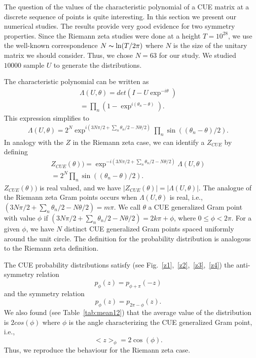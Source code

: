 \documentclass[twoside]{article}
\begin{document}
The question of the values of the characteristic polynomial of a CUE matrix 
at a discrete sequence of points is quite interesting. 
In this section we present our numerical studies. The results provide very good evidence 
for two  symmetry properties. Since the Riemann zeta studies were done at a
height $T = 10^{28}$, we use the well-known correspondence $N \thicksim \ln(T/2\pi)$ where $N$ 
is the size of the unitary matrix we should consider. Thus, we chose $N = 63$ for our
study. We studied $10000$ sample $U$ to generate the distributions.

The characteristic polynomial can be written as
\begin{align}
\Lambda(U, \theta) = det(I-U\exp^{-i\theta})\\
                   = \prod_{n}(1-\exp^{i(\theta_{n} - \theta)}).
\label{eq:cueDet}
\end{align}
This expression simplifies to
\begin{align}
\Lambda(U, \theta)  = 2^N\exp^{i(3N\pi/2 + \sum_{n}\theta_{n}/2 - N\theta/2)}\prod_{n}\sin((\theta_{n} - \theta)/2).
\label{eq:cueExpanded}
\end{align}
In analogy with the $Z$ in the Riemann zeta case, we can identify a $Z_{CUE}$ by defining
\begin{align}
Z_{CUE}(\theta))    = \exp^{-i(3N\pi/2 + \sum_{n}\theta_{n}/2 - N\theta/2)}\Lambda(U, \theta)\\
                    = 2^N\prod_{n}\sin((\theta_{n} - \theta)/2).
\label{eq:cueZ}
\end{align}
$Z_{CUE}(\theta))$ is real valued,
and we have $|Z_{CUE}(\theta)| = |\Lambda(U, \theta)|$. The analogue of the Riemann zeta 
Gram points occurs when $\Lambda(U, \theta)$ is real, i.e., 
$(3N\pi/2 + \sum_{n}\theta_{n}/2 - N\theta/2) = m\pi$.
We call $\theta$  a CUE generalized Gram point with value $\phi$  if
$(3N\pi/2 + \sum_{n}\theta_{n}/2 - N\theta/2) = 2k\pi + \phi$, where $0 \le \phi < 2\pi$.
For a given $\phi$, we have $N$ distinct CUE generalized Gram points spaced uniformly
around the unit circle.
The definition for the probability distribution is analogous to the Riemann zeta definition.

The CUE probability distributions satisfy (see Fig.~\ref{z1},~\ref{z2},~\ref{z3},~\ref{z4}) 
the anti-symmetry relation 
\begin{equation}
p_{\phi}(z) = p_{\phi+\pi}(-z)
\label{eq:antisym}
\end{equation}
and the symmetry relation 
\begin{equation}
p_{\phi}(z) = p_{2\pi-\phi}(z).
\label{eq:sym}
\end{equation}
We also found  (see Table~\ref{tab:mean12}) that the average value of the 
distribution is $2cos(\phi)$ where $\phi$
is the angle characterizing the CUE generalized Gram point, i.e., 
\begin{equation}
<z>_{\phi} = 2\cos(\phi).
\label{eq:cosphi}
\end{equation}
Thus, we reproduce the behaviour for the Riemann zeta case.
\end{document}
